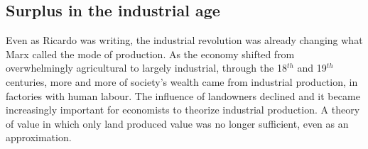 \subsection{Surplus in the industrial age}

Even as Ricardo was writing, the industrial revolution was already changing what Marx called the mode of production.  As the economy shifted  from overwhelmingly agricultural to largely industrial,  through %
the 18$^{th}$  and 19$^{th}$ centuries, more and more of society's wealth came from industrial production, in factories with human labour. The influence of landowners declined and it became increasingly important for economists to theorize industrial production. A theory of value in which only land produced value was no longer sufficient, even as an approximation. 

